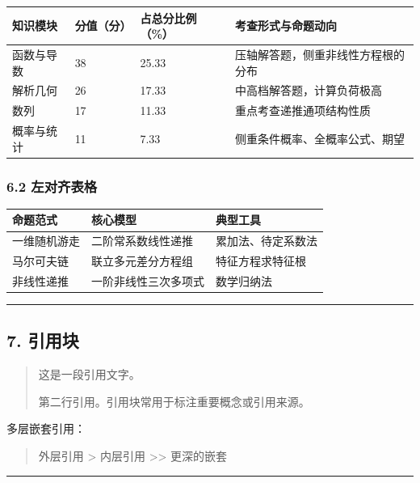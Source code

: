 \begin{longtable}[]{@{}llll@{}}
\toprule\noalign{}
知识模块 & 分值（分） & 占总分比例（\%） & 考查形式与命题动向 \\
\midrule\noalign{}
\endhead
\bottomrule\noalign{}
\endlastfoot
函数与导数 & 38 & 25.33 & 压轴解答题，侧重非线性方程根的分布 \\
解析几何 & 26 & 17.33 & 中高档解答题，计算负荷极高 \\
数列 & 17 & 11.33 & 重点考查递推通项结构性质 \\
概率与统计 & 11 & 7.33 & 侧重条件概率、全概率公式、期望 \\
\end{longtable}

\subsubsection{6.2 左对齐表格}\label{ux5de6ux5bf9ux9f50ux8868ux683c}

\begin{longtable}[]{@{}lll@{}}
\toprule\noalign{}
命题范式 & 核心模型 & 典型工具 \\
\midrule\noalign{}
\endhead
\bottomrule\noalign{}
\endlastfoot
一维随机游走 & 二阶常系数线性递推 & 累加法、待定系数法 \\
马尔可夫链 & 联立多元差分方程组 & 特征方程求特征根 \\
非线性递推 & 一阶非线性三次多项式 & 数学归纳法 \\
\end{longtable}

\begin{center}\rule{0.5\linewidth}{0.5pt}\end{center}

\subsection{7. 引用块}\label{ux5f15ux7528ux5757}

\begin{quote}
这是一段引用文字。

第二行引用。引用块常用于标注重要概念或引用来源。
\end{quote}

多层嵌套引用：

\begin{quote}
外层引用 \textgreater{} 内层引用 \textgreater\textgreater{} 更深的嵌套
\end{quote}

\begin{center}\rule{0.5\linewidth}{0.5pt}\end{center}

